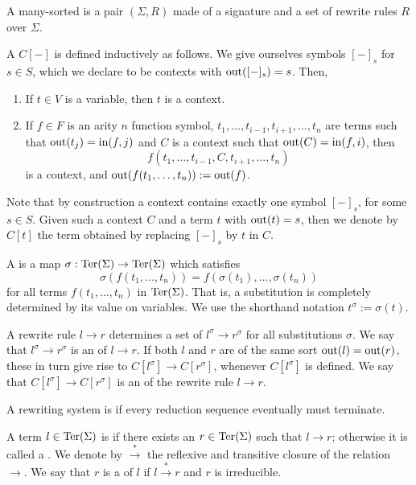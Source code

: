 \begin{definition}
  A many-sorted  is a pair $(\Sigma,R)$ made of a signature and a set of rewrite rules $R$ over $\Sigma$.
\end{definition}

A  $C[-]$ is defined inductively as follows.
We give ourselves symbols $[-]_s$ for~$s\in S$, which we declare to be contexts with $\operatorname{out}([-]_s)=s$. 
Then, 
\begin{enumerate}
  \item If $t \in V$ is a variable, then $t$ is a context.
  \item If $f \in F$ is an arity $n$ function symbol, $t_1,\ldots,t_{i-1},t_{i+1},\ldots,t_n$ are terms such that $\operatorname{out}(t_j)=\operatorname{in}(f,j)$ and $C$ is a context such that $\operatorname{out}(C)=\operatorname{in}(f,i)$, then 
  $$f(t_1,\ldots,t_{i-1},C,t_{i+1},\ldots,t_n)$$
   is a context, and $\operatorname{out}(f(t_1,\ldots,t_n)):=\operatorname{out}(f)$.
\end{enumerate}
Note that by construction a context contains exactly one symbol $[-]_s$, for some $s \in S$.
Given such a context $C$ and a term $t$ with $\operatorname{out}(t)=s$, then we denote by $C[t]$ the term obtained by replacing $[-]_s$ by $t$ in $C$.

A  is a map $\sigma : \operatorname{Ter}(\Sigma) \to \operatorname{Ter}(\Sigma)$ which satisfies $$\sigma(f(t_1,\ldots,t_n))=f(\sigma(t_1),\ldots,\sigma(t_n))$$ for all terms $f(t_1,\ldots,t_n)$ in $\operatorname{Ter}(\Sigma)$.
That is, a substitution is completely determined by its value on variables.
We use the shorthand notation $t^{\sigma}:=\sigma(t)$.

A rewrite rule $l \to r$ determines a set of  $l^\sigma \to r^\sigma$ for all substitutions $\sigma$. 
We say that $l^\sigma \to r^\sigma$ is an  of $l \to r$.
If both $l$ and $r$ are of the same sort $\operatorname{out}(l)=\operatorname{out}(r)$, these in turn give rise to  $C[l^\sigma] \to C[r^\sigma]$, whenever $C[l^\sigma]$ is defined. 
We say that $C[l^\sigma] \to C[r^\sigma]$ is an  of the rewrite rule $l \to r$.

A rewriting system is  if every reduction sequence eventually must terminate.

A term $l \in \operatorname{Ter}(\Sigma)$ is  if there exists an $r \in \operatorname{Ter}(\Sigma)$ such that $l \to r$; otherwise it is called a .
We denote by $\overset{*}{\to}$ the reflexive and transitive closure of the relation~$\to$.
We say that $r$ is a  of $l$ if $l \overset{*}{\to} r$ and $r$ is irreducible.

